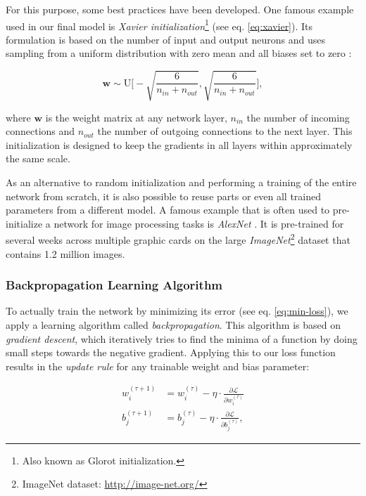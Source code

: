 For this purpose, some best practices have been developed. One famous example used in our final model is \textit{Xavier initialization}\footnote{Also known as Glorot initialization.} (see eq. \ref{eq:xavier}). Its formulation is based on the number of input and output neurons and uses sampling from a uniform distribution with zero mean and all biases set to zero \parencite{xavier-init}:

\begin{equation} \label{eq:xavier}
  \textbf{w} \sim \textrm{U} \bigg[-\sqrt{\frac{6}{n_{in} + n_{out}}}, \sqrt{\frac{6}{n_{in} + n_{out}}}\bigg] ,
\end{equation}

where $ \textbf{w} $ is the weight matrix at any network layer, $ n_{in} $ the number of incoming connections and $ n_{out} $ the number of outgoing connections to the next layer. This initialization is designed to keep the gradients in all layers within approximately the same scale.

As an alternative to random initialization and performing a training of the entire network from scratch, it is also possible to reuse parts or even all trained parameters from a different model. A famous example that is often used to pre-initialize a network for image processing tasks is \textit{AlexNet} \parencite{imagenet}. It is pre-trained for several weeks across multiple graphic cards on the large \textit{ImageNet}\footnote{ImageNet dataset: \url{http://image-net.org/}} dataset that contains 1.2 million images.

\subsubsection{Backpropagation Learning Algorithm}

To actually train the network by minimizing its error (see eq. \ref{eq:min-loss}), we apply a learning algorithm called \textit{backpropagation}. This algorithm is based on \textit{gradient descent}, which iteratively tries to find the minima of a function by doing small steps towards the negative gradient. Applying this to our loss function results in the \textit{update rule} for any trainable weight and bias parameter:

\begin{equation} \label{eq:gradient_descent}
\begin{aligned}
w_{i}^{(\tau + 1)} &= w_{i}^{(\tau)} - \eta \cdot \frac{\partial \mathcal{L}}{\partial w_{i}^{(\tau)}} \\
b_{j}^{(\tau + 1)} &= b_{j}^{(\tau)} - \eta \cdot \frac{\partial \mathcal{L}}{\partial b_{j}^{(\tau)}} ,
\end{aligned}
\end{equation}

